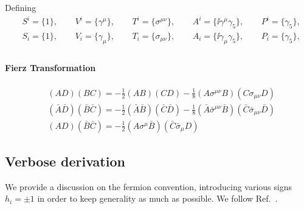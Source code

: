 \documentclass[CheatSheet]{subfiles}
\begin{document}
Defining
\begin{align}
 &S^i = \{1\},~~
&&V^i = \{\gamma^\mu\},~~
&&T^i = \{\sigma^{\mu\nu}\},~~
&&A^i = \{\ii\gamma^\mu\gamma_5\},~~
&&P^i = \{\gamma_5\},\\
%
 &S_i = \{1\},~~
&&V_i = \{\gamma_\mu\},~~
&&T_i = \{\sigma_{\mu\nu}\},~~
&&A_i = \{\ii\gamma_\mu\gamma_5\},~~
&&P_i = \{\gamma_5\},\\
%
\end{align}



\paragraph{Fierz Transformation}
\begin{align}
  &(AD)(BC)=-\frac12(AB)(CD)-\frac18(A\sigma^{\mu\nu}B)(C\sigma_{\mu\nu}D)
  \\
  &(\bar A\bar D)(\bar B\bar C)=-\frac12(\bar A\bar B)(\bar C\bar D)-\frac18(\bar A\bar \sigma^{\mu\nu}\bar B)(\bar C\bar \sigma_{\mu\nu}\bar D)
  \\
  &(AD)(\bar B\bar C)=-\frac12(A\sigma^\mu\bar B)(\bar C\bar\sigma_\mu D)
\end{align}

\newpage
\detailstyle

\subsection{Verbose derivation}
We provide a discussion on the fermion convention, introducing various signs $h_i=\pm1$ in order to keep generality as much as possible. We follow Ref.~\cite{Kugo1}.
\end{document}
